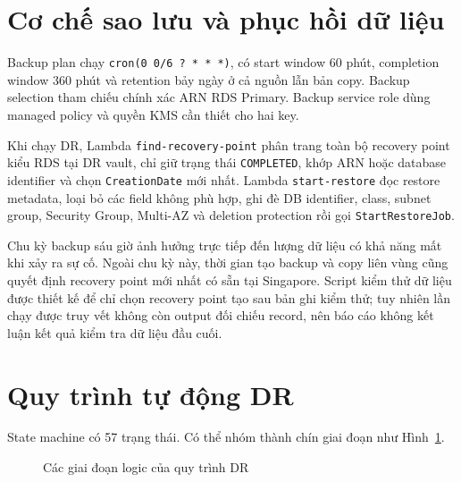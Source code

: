 \section{Cơ chế sao lưu và phục hồi dữ liệu}

Backup plan chạy \texttt{cron(0 0/6 ? * * *)}, có start window 60 phút, completion window 360 phút và retention bảy ngày ở cả nguồn lẫn bản copy. Backup selection tham chiếu chính xác ARN RDS Primary. Backup service role dùng managed policy và quyền KMS cần thiết cho hai key.

Khi chạy DR, Lambda \texttt{find-recovery-point} phân trang toàn bộ recovery point kiểu RDS tại DR vault, chỉ giữ trạng thái \texttt{COMPLETED}, khớp ARN hoặc database identifier và chọn \texttt{CreationDate} mới nhất. Lambda \texttt{start-restore} đọc restore metadata, loại bỏ các field không phù hợp, ghi đè DB identifier, class, subnet group, Security Group, Multi-AZ và deletion protection rồi gọi \texttt{StartRestoreJob}.

Chu kỳ backup sáu giờ ảnh hưởng trực tiếp đến lượng dữ liệu có khả năng mất khi xảy ra sự cố. Ngoài chu kỳ này, thời gian tạo backup và copy liên vùng cũng quyết định recovery point mới nhất có sẵn tại Singapore. Script kiểm thử dữ liệu được thiết kế để chỉ chọn recovery point tạo sau bản ghi kiểm thử; tuy nhiên lần chạy được truy vết không còn output đối chiếu record, nên báo cáo không kết luận kết quả kiểm tra dữ liệu đầu cuối.

\section{Quy trình tự động DR}

State machine có 57 trạng thái. Có thể nhóm thành chín giai đoạn như Hình~\ref{fig:dr-sequence}.

\begin{figure}[H]
\centering
{}
\caption{Các giai đoạn logic của quy trình DR}
\label{fig:dr-sequence}
\end{figure}

